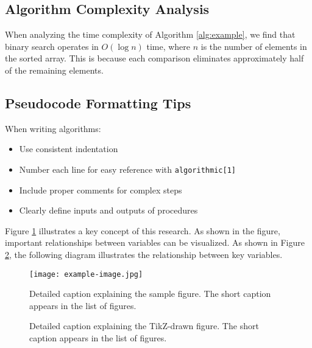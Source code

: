 \documentclass[12pt,a4paper]{report}
\begin{document}
\subsection{Algorithm Complexity Analysis}
When analyzing the time complexity of Algorithm \ref{alg:example}, we find that binary search operates in $O(\log n)$ time, where $n$ is the number of elements in the sorted array. This is because each comparison eliminates approximately half of the remaining elements.

\subsection{Pseudocode Formatting Tips}
When writing algorithms:
\begin{itemize}
    \item Use consistent indentation
    \item Number each line for easy reference with \texttt{algorithmic[1]}
    \item Include proper comments for complex steps
    \item Clearly define inputs and outputs of procedures
\end{itemize}

Figure \ref{fig:external_image} illustrates a key concept of this research. As shown in the figure, important relationships between variables can be visualized.
As shown in Figure \ref{fig:tikz_figure}, the following diagram illustrates the relationship between key variables.

\begin{figure}[H]
    \centering
    \texttt{[image: example-image.jpg]} %
    \caption[Short caption for sample figure]{Detailed caption explaining the sample figure. The short caption appears in the list of figures.}
    \label{fig:external_image}
\end{figure}

\begin{figure}[H]
    \centering
    \caption[Short caption for TikZ figure]{Detailed caption explaining the TikZ-drawn figure. The short caption appears in the list of figures.}
    \label{fig:tikz_figure}
\end{figure}
\end{document}
